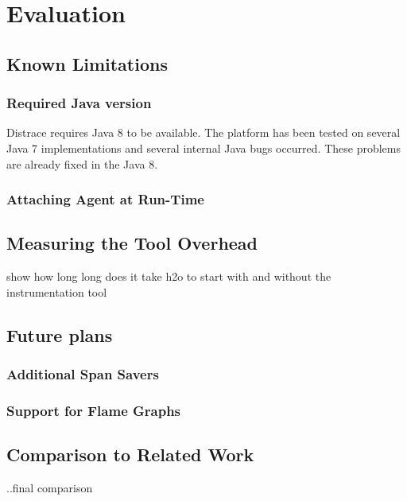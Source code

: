 \chapter{Evaluation}
\label{chap:evaluation}

\section{Known Limitations}
\subsection{Required Java version}
Distrace requires Java 8 to be available. The platform has been tested on several Java 7 implementations and several internal Java bugs occurred. These problems are already fixed in the Java 8.

\subsection{Attaching Agent at Run-Time}

\section{Measuring the Tool Overhead}
show how long long does it take h2o to start with and without the instrumentation tool
\section{Future plans}
\subsection{Additional Span Savers}
\subsection{Support for Flame Graphs}

\section{Comparison to Related Work}
..final comparison

